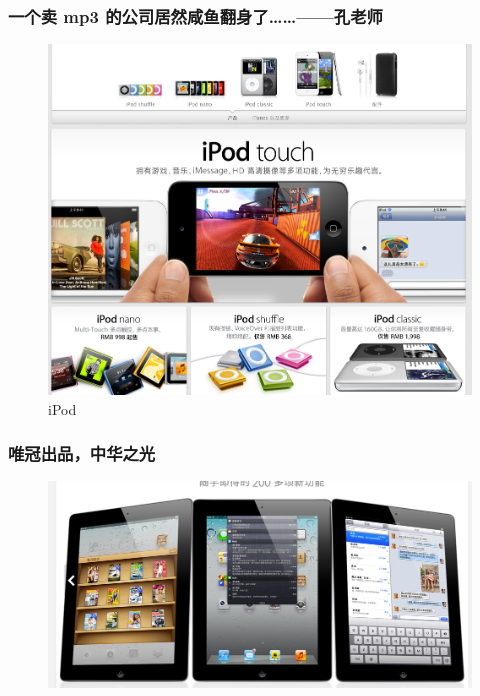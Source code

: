 \documentclass[utf8x, notes=hide]{beamer}
\begin{document}
\begin{frame}
\frametitle{一个卖 mp3 的公司居然咸鱼翻身了……——孔老师}
  \begin{figure}
    \centering
    \includegraphics[bb=0 0 1003 830,scale=.2]{images/iPod.png}    
    \caption{iPod}
    \label{fig:iPod}
  \end{figure}
\end{frame}
\begin{frame}
\frametitle{唯冠出品，中华之光}
  \begin{figure}
    \centering
    \includegraphics[bb=0 0 1004 489,scale=.2]{images/iPad.png}
    \label{fig:iPad}
  \end{figure}
\end{frame}
\end{document}
